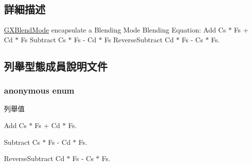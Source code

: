 \subsection{詳細描述}
\hyperlink{class_i_dream_sky_1_1_g_x_blend_mode}{G\+X\+Blend\+Mode} encapsulate a Blending Mode Blending Equation\+: Add Cs $\ast$ Fs + Cd $\ast$ Fs Subtract Cs $\ast$ Fs -\/ Cd $\ast$ Fs Reverse\+Subtract Cd $\ast$ Fs -\/ Cs $\ast$ Fs. 

\subsection{列舉型態成員說明文件}
\subsubsection[{\texorpdfstring{anonymous enum}{anonymous enum}}]{\setlength{\rightskip}{0pt plus 5cm}anonymous enum}\hypertarget{class_i_dream_sky_1_1_g_x_blend_mode_a682f70193e86e5f6fdcfe1bd2712cb53}{}\label{class_i_dream_sky_1_1_g_x_blend_mode_a682f70193e86e5f6fdcfe1bd2712cb53}
\begin{Desc}
\item[列舉值]\par
\begin{description}
\item[{\em 
Add\hypertarget{class_i_dream_sky_1_1_g_x_blend_mode_a682f70193e86e5f6fdcfe1bd2712cb53ad5210778b75eb7c9af10dfb33b5d8b68}{}\label{class_i_dream_sky_1_1_g_x_blend_mode_a682f70193e86e5f6fdcfe1bd2712cb53ad5210778b75eb7c9af10dfb33b5d8b68}
}]Add Cs $\ast$ Fs + Cd $\ast$ Fs. \item[{\em 
Subtract\hypertarget{class_i_dream_sky_1_1_g_x_blend_mode_a682f70193e86e5f6fdcfe1bd2712cb53aef589545008c82e0b567c5522a09cdda}{}\label{class_i_dream_sky_1_1_g_x_blend_mode_a682f70193e86e5f6fdcfe1bd2712cb53aef589545008c82e0b567c5522a09cdda}
}]Subtract Cs $\ast$ Fs -\/ Cd $\ast$ Fs. \item[{\em 
Reverse\+Subtract\hypertarget{class_i_dream_sky_1_1_g_x_blend_mode_a682f70193e86e5f6fdcfe1bd2712cb53aa8229ac90a7b08e7ac7714637a8b13aa}{}\label{class_i_dream_sky_1_1_g_x_blend_mode_a682f70193e86e5f6fdcfe1bd2712cb53aa8229ac90a7b08e7ac7714637a8b13aa}
}]Reverse\+Subtract Cd $\ast$ Fs -\/ Cs $\ast$ Fs. \end{description}
\end{Desc}


